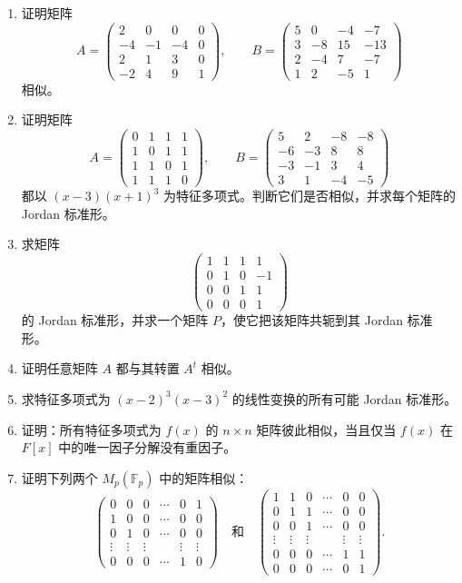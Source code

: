 \begin{enumerate}[label=\arabic*.]
\item 证明矩阵
\[
A=\begin{pmatrix}
2&0&0&0\\
-4&-1&-4&0\\
2&1&3&0\\
-2&4&9&1
\end{pmatrix},
\qquad
B=\begin{pmatrix}
5&0&-4&-7\\
3&-8&15&-13\\
2&-4&7&-7\\
1&2&-5&1
\end{pmatrix}
\]
相似。

\item 证明矩阵
\[
A=\begin{pmatrix}
0&1&1&1\\
1&0&1&1\\
1&1&0&1\\
1&1&1&0
\end{pmatrix},
\qquad
B=\begin{pmatrix}
5&2&-8&-8\\
-6&-3&8&8\\
-3&-1&3&4\\
3&1&-4&-5
\end{pmatrix}
\]
都以 $(x-3)(x+1)^3$ 为特征多项式。判断它们是否相似，并求每个矩阵的 Jordan 标准形。

\item 求矩阵
\[
\begin{pmatrix}
1&1&1&1\\
0&1&0&-1\\
0&0&1&1\\
0&0&0&1
\end{pmatrix}
\]
的 Jordan 标准形，并求一个矩阵 $P$，使它把该矩阵共轭到其 Jordan 标准形。

\item 证明任意矩阵 $A$ 都与其转置 $A^t$ 相似。

\item 求特征多项式为 $(x-2)^3(x-3)^2$ 的线性变换的所有可能 Jordan 标准形。

\item 证明：所有特征多项式为 $f(x)$ 的 $n\times n$ 矩阵彼此相似，当且仅当 $f(x)$ 在 $F[x]$ 中的唯一因子分解没有重因子。

\item 证明下列两个 $M_p(\mathbb F_p)$ 中的矩阵相似：
\[
\begin{pmatrix}
0&0&0&\cdots&0&1\\
1&0&0&\cdots&0&0\\
0&1&0&\cdots&0&0\\
\vdots&\vdots&\vdots& &\vdots&\vdots\\
0&0&0&\cdots&1&0
\end{pmatrix}
\quad\text{和}\quad
\begin{pmatrix}
1&1&0&\cdots&0&0\\
0&1&1&\cdots&0&0\\
0&0&1&\cdots&0&0\\
\vdots&\vdots&\vdots& &\vdots&\vdots\\
0&0&0&\cdots&1&1\\
0&0&0&\cdots&0&1
\end{pmatrix}.
\]


\end{enumerate}
